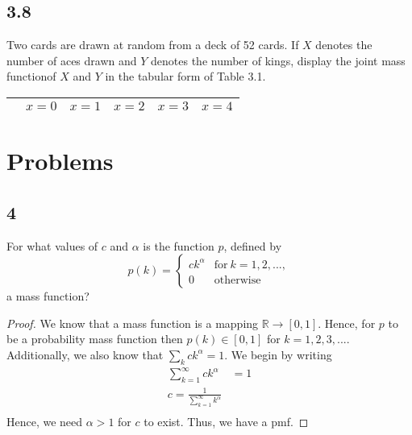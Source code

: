 \documentclass{article}
\newcommand{\R}{\mathbb{R}}
\newcommand{\ra}{\rightarrow}
\begin{document}
    \subsection*{3.8}
    Two cards are drawn at random from a deck of 52 cards. If $X$ denotes the number
    of aces drawn and $Y$ denotes the number of kings, display the joint mass
    functionof $X$ and $Y$ in the tabular form of Table 3.1.
    \begin{table}[h!]
        \begin{center}
            \begin{tabular}{r | c | c | c | c | c}
                & $x = 0$ & $x = 1$ & $x = 2$  & $x = 3$ & $x = 4$ \\
                \hline
            \end{tabular}
        \end{center}
    \end{table}
    \section*{Problems}
    \subsection*{4}
    For what values of $c$ and $\alpha$ is the function $p$, defined by
    $$p(k) = \begin{cases}
        ck^\alpha & \text{for} \ k = 1,2,..., \\
        0 & \text{otherwise}
    \end{cases}$$
    a mass function?
    \begin{proof}
        We know that a mass function is a mapping $\R \ra [0,1]$. Hence, for $p$ to
        be a probability mass function then $p(k) \in [0,1]$ for $k=1,2,3,...$. 
        Additionally, we also know that $\sum_k ck^\alpha = 1$. We begin
        by writing
        \begin{align*}
            \sum_{k=1}^\infty ck^\alpha &= 1 \\
            c = \frac{1}{\sum_{k=1}^\infty k^\alpha} \\
        \end{align*}
        Hence, we need $\alpha > 1$ for $c$ to exist. Thus, we have
        a pmf.

    \end{proof}
\end{document}
